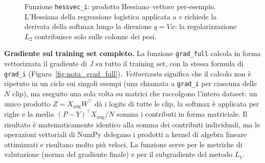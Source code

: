 \documentclass[a4paper,12pt]{article}
\numberwithin{equation}{section}
\numberwithin{figure}{section}
\numberwithin{table}{section}
\begin{document}
\begin{figure}[H]
\centering
{}
\caption{Funzione \texttt{hessvec\_i}: prodotto Hessiano--vettore per-esempio.
L'Hessiana della regressione logistica applicata a $v$ richiede la derivata
della softmax lungo la direzione $q = Vx$; la regolarizzazione $L_2$
contribuisce solo sulle colonne dei pesi.}
\label{fig:nota_hess}
\end{figure}

\textbf{Gradiente sul training set completo.}
La funzione \texttt{grad\_full} calcola in forma vettorizzata il gradiente di
$J$ su tutto il training set, con la stessa formula di \texttt{grad\_i}
(Figura~\ref{fig:nota_grad_full}). \emph{Vettorizzata} significa che il
calcolo non è ripetuto in un ciclo sui singoli esempi (una chiamata a
\texttt{grad\_i} per ciascuna delle $N$ clip), ma eseguito una sola volta su
matrici che raccolgono l'intero dataset: un unico prodotto
$Z = X_{\mathrm{aug}} W^{\top}$ dà i logits di tutte le clip, la softmax è
applicata per righe e la media $(P-Y)^{\top} X_{\mathrm{aug}}/N$ somma i
contributi in forma matriciale. Il risultato è matematicamente identico alla
somma dei contributi individuali, ma le operazioni vettoriali di NumPy
delegano i prodotti a kernel di algebra lineare ottimizzati e risultano molto
più veloci. La funzione serve per le metriche di valutazione (norma del
gradiente finale) e per il subgradiente del metodo $L_1$.
\end{document}
